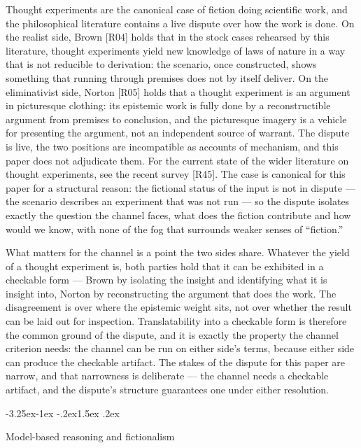 \documentclass[11pt,a4paper]{article}
\makeatletter
\renewcommand\subsection{\@startsection{subsection}{2}{\z@}%
  {-3.25ex\@plus -1ex \@minus -.2ex}{1.5ex \@plus .2ex}%
  {\normalfont\large\bfseries\raggedright}}
\makeatother
\begin{document}
Thought experiments are the canonical case of fiction doing scientific work, and the philosophical literature contains a live dispute over how the work is done. On the realist side, Brown [R04] holds that in the stock cases rehearsed by this literature, thought experiments yield new knowledge of laws of nature in a way that is not reducible to derivation: the scenario, once constructed, shows something that running through premises does not by itself deliver. On the eliminativist side, Norton [R05] holds that a thought experiment is an argument in picturesque clothing: its epistemic work is fully done by a reconstructible argument from premises to conclusion, and the picturesque imagery is a vehicle for presenting the argument, not an independent source of warrant. The dispute is live, the two positions are incompatible as accounts of mechanism, and this paper does not adjudicate them. For the current state of the wider literature on thought experiments, see the recent survey [R45]. The case is canonical for this paper for a structural reason: the fictional status of the input is not in dispute — the scenario describes an experiment that was not run — so the dispute isolates exactly the question the channel faces, what does the fiction contribute and how would we know, with none of the fog that surrounds weaker senses of ``fiction.''

What matters for the channel is a point the two sides share. Whatever the yield of a thought experiment is, both parties hold that it can be exhibited in a checkable form — Brown by isolating the insight and identifying what it is insight into, Norton by reconstructing the argument that does the work. The disagreement is over where the epistemic weight sits, not over whether the result can be laid out for inspection. Translatability into a checkable form is therefore the common ground of the dispute, and it is exactly the property the channel criterion needs: the channel can be run on either side's terms, because either side can produce the checkable artifact. The stakes of the dispute for this paper are narrow, and that narrowness is deliberate — the channel needs a checkable artifact, and the dispute's structure guarantees one under either resolution.

\subsection{Model-based reasoning and fictionalism}
\end{document}
